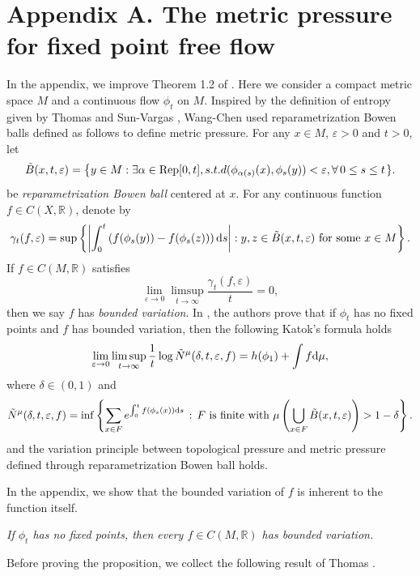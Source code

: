 \documentclass[10pt]{article}
\newtheorem*{Theorem A}{Theorem A}
\begin{document}
\section*{Appendix
 A. The metric pressure for fixed point free flow}
In the appendix, we improve Theorem 1.2 of  \cite{WangChen}. Here we consider a compact metric space $M$ and a continuous flow $\phi_t$ on $M$.   Inspired by the definition of entropy given by Thomas \cite{Thomas_1987} and Sun-Vargas \cite{Sun1999315}, Wang-Chen \cite{WangChen} used reparametrization Bowen balls defined as follows to define metric pressure. For any $x\in M$, $\varepsilon>0$ and $t>0$, let
$$\tilde B(x, t, \varepsilon)=\left\{y\in M : \exists \alpha\in {\rm Rep}[0,t], s.t. d(\phi_{\alpha(s)}(x), \phi_s(y))<\varepsilon, \forall\, 0\leq s\leq t\right.\}.$$
be {\it reparametrization Bowen ball} centered at $x$.
For any continuous function \( f \in C(X, \mathbb{R}) \), denote by
\[
\gamma_t(f, \varepsilon) = \sup \left\{ \left| \int_0^t \left( f(\phi_s (y)) - f(\phi_s (z)) \right) {\rm d}s \right|: y, z \in \tilde{B}(x, t, \varepsilon) \text{ for some } x \in M \right\}.
\]
If $f\in C(M, \mathbb{R})$ satisfies
\[
\lim_{\varepsilon \to 0} \limsup_{t \to \infty} \frac{\gamma_t(f, \varepsilon)}{t} = 0,
\]
then we say $f$ has {\it bounded variation}. In \cite{WangChen}, the authors prove that if $\phi_t$ has no fixed points and $f$ has bounded variation, then the following Katok's formula holds
$$\lim_{\varepsilon\to 0}\limsup_{t\to\infty}\frac{1}{t}\log\tilde{N}^\mu(\delta, t, \varepsilon, f)=h(\phi_1)+\int f{\rm d}\mu,$$
where $\delta\in(0,1)$ and
\[\tilde N^\mu(\delta, t, \varepsilon, f)=\inf_{}\left\{\sum_{x\in F}e^{\int_0^tf(\phi_s(x)){\rm d}s} \,:\, F \text{ is finite with }\mu\left(\bigcup_{x\in F}\tilde B(x, t, \varepsilon)\right)>1-\delta\right\}.\]
and the variation principle between topological pressure and metric pressure defined through reparametrization Bowen ball holds.

In the appendix, we show that the bounded variation of \(f\) is inherent to the function itself.

\bigskip
{} {\it If $\phi_t$ has no fixed points, then every $f\in C(M, \mathbb{R})$ has bounded variation.}

\bigskip

Before proving the proposition, we collect the following result of Thomas \cite{Thomas_1987}.

\bigskip
\end{document}
